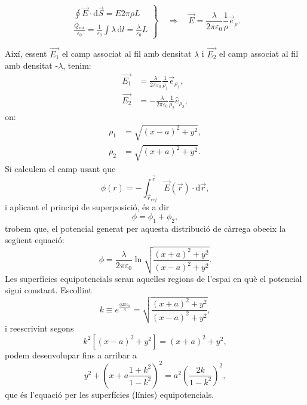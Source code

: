 \documentclass[a4paper,10.5pt]{report}
\begin{document}
\begin{appendices}
\[
\left.
\begin{array}{c}
	\oint \vec{E} \cdot \mathrm{d}\vec{S} = E 2\pi \rho L \\[10pt]
	\frac{Q_{int}}{\varepsilon_0} = \frac{1}{\varepsilon_0} \int \lambda \, \mathrm{d}l = \frac{\lambda}{\varepsilon_0} L
\end{array}
\right\}
\quad \Rightarrow \quad 
\vec{E} = \frac{\lambda}{2\pi \varepsilon_0} \frac{1}{\rho} \vec{e}_{\rho}.
\]

Així, essent $\vec{E_1}$ el camp associat al fil amb densitat $\lambda$ i $\vec{E_2}$ el camp associat al fil amb densitat -$\lambda$, tenim:
\begin{align}
	\vec{E_1} & = \frac{\lambda}{2\pi \varepsilon_0} \frac{1}{\rho_1} \vec{e}_{\rho_1}, \\
	\vec{E_2} & = -\frac{\lambda}{2\pi \varepsilon_0} \frac{1}{\rho_2} \hat{e}_{\rho_2},
\end{align}
on:
\begin{align}
	\rho_1 & = \sqrt{(x-a)^2+y^2}, \\
	\rho_2 & = \sqrt{(x+a)^2+y^2}. 
\end{align}
Si calculem el camp usant que
\begin{equation}
	\phi(r) = -\int_{\vec{r}_{ref}}^{\vec{r}}\vec{E}(\vec{r})\cdot \mathrm{d}\vec{r} ,
\end{equation}
i aplicant el principi de superposició, és a dir
\begin{equation}
	\phi = \phi_1+\phi_2,
\end{equation}
trobem que, el potencial generat per aquesta distribució de càrrega obeeix la següent equació:
\begin{equation}
	\phi = \frac{\lambda}{2\pi \varepsilon_0}\ln\sqrt{\frac{(x+a)^2+y^2}{(x-a)^2+y^2}}.
\end{equation}
Les superfícies equipotencials seran aquelles regions de l'espai en què el potencial sigui constant. Escollint
\begin{equation}
	k \equiv e^{\frac{\phi2\pi\varepsilon_0}{\lambda}} = \sqrt{\frac{(x+a)^2+y^2}{(x-a)^2+y^2}},
\end{equation}
i reescrivint segons
\begin{equation}
	k^2[(x-a)^2+y^2]=(x+a)^2+y^2,
\end{equation}  
podem desenvolupar fins a arribar a
\begin{equation}
	\boxed{y^2+\left( x+a\frac{1+k^2}{1-k^2}\right)^2 = a^2\left( \frac{2k}{1-k^2}\right)^2},
\end{equation}
que és l'equació per les superfícies (línies) equipotencials.


\end{appendices}
\end{document}
